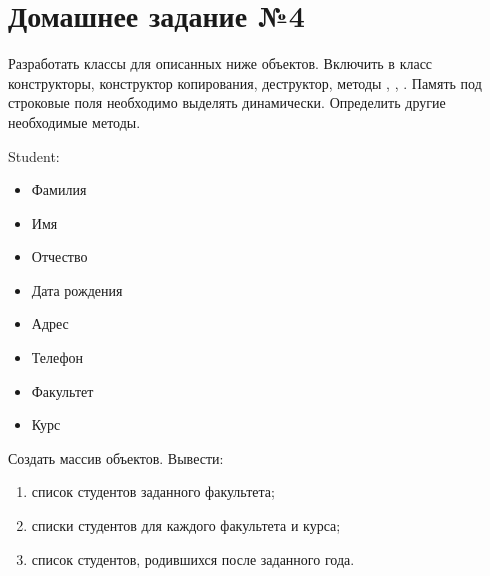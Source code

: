 \section*{Домашнее задание №4}

Разработать классы для описанных ниже объектов. Включить в класс
конструкторы, конструктор копирования, деструктор, методы ,
, . Память под строковые поля необходимо выделять
динамически. Определить другие необходимые методы.

Student:
\begin{itemize}
	\item Фамилия
	\item Имя
	\item Отчество
	\item Дата рождения
	\item Адрес
	\item Телефон
	\item Факультет
	\item Курс
\end{itemize}

Создать массив объектов. Вывести:
\begin{enumerate}
	\item список студентов заданного факультета;
	\item списки студентов для каждого факультета и курса;
	\item список студентов, родившихся после заданного года.
\end{enumerate}
